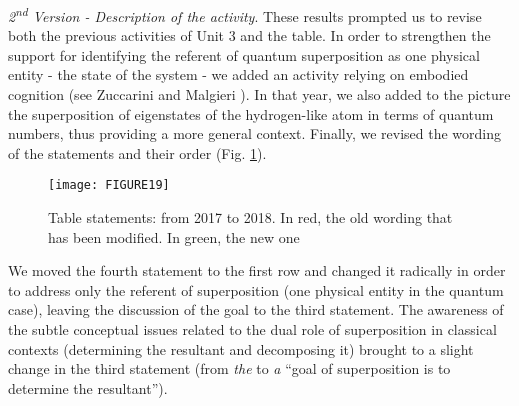 \documentclass[twocolumn,secnumarabic,amssymb, nobibnotes, aps, prd, nofootinbib]{revtex4-2}
\begin{document}
\emph{2\textsuperscript{nd} Version - Description of the activity}. These results prompted us to revise both the previous activities of Unit 3 and the table. In order to strengthen the support for identifying the referent of quantum superposition as one physical entity - the state of the system - we added an activity relying on embodied cognition (see Zuccarini and Malgieri \cite{Zuccarini2022}). In that year, we also added to the picture the superposition of eigenstates of the hydrogen-like atom in terms of quantum numbers, thus providing a more general context. Finally, we revised the wording of the statements and their order (Fig. \ref{FIG:19}).
\begin{figure}[!htpb]
       \texttt{[image: FIGURE19]}
    \caption{Table statements: from 2017 to 2018. In red, the old wording that has been modified. In green, the new one}
    \label{FIG:19}
\end{figure}
We moved the fourth statement to the first row and changed it radically in order to address only the referent of superposition (one physical entity in the quantum case), leaving the discussion of the goal to the third statement. The awareness of the subtle conceptual issues related to the dual role of superposition in classical contexts (determining the resultant and decomposing it) brought to a slight change in the third statement (from \emph{the} to \emph{a} ``goal of superposition is to determine the resultant'').
\end{document}
